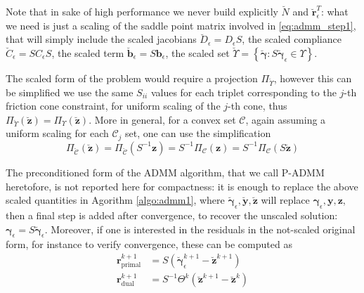 \documentclass[final,3p]{elsarticle}
\newcommand{\vect}[1]{\bm{#1}}
\begin{document}
Note that in sake of high performance we never build explicitly $\breve{N}$ and $\breve{\vect{r}}^T_\epsilon$: what we need is just a scaling of the saddle point matrix involved in \eqref{eq:admm_step1}, that will simply include the scaled jacobians
$\breve{D}_\epsilon = D_\epsilon S$, the scaled compliance
$\breve{C}_\epsilon = S C_\epsilon S$,  the scaled term 
$\breve{\vect{b}}_\epsilon = S \vect{b}_\epsilon$, the scaled set
$\breve{\Upsilon} = \left\{ \breve{\vect{\gamma}} : S \breve{\vect{\gamma}}_\epsilon \in \Upsilon  \right\}$.

The scaled form of the problem would require a projection $\Pi_{\breve{\Upsilon}}$, however this can be simplified we use the same $S_{ii}$ values for each triplet corresponding to the $j$-th friction cone constraint, for uniform scaling of the $j$-th cone, thus $\Pi_{\breve{\Upsilon}}(\breve{\vect{z}}) = \Pi_{\Upsilon}(\breve{\vect{z}})$. 
More in general, for a convex set $\mathcal{C}$, again assuming a uniform scaling for each $\mathcal{C}_j$ set, one can use the simplification
\[
\Pi_{\breve{\mathcal{C}}}(\breve{\vect{z}}) 
= \Pi_{\breve{\mathcal{C}}}(S^{-1}\vect{z}) 
= S^{-1} \Pi_{\mathcal{C}}(\vect{z}) 
= S^{-1} \Pi_{\mathcal{C}}( S \breve{\vect{z}})
\]

The preconditioned form of the ADMM algorithm, that we call P-ADMM heretofore, is not reported here for compactness: it is enough to replace the above scaled quantities in Agorithm \ref{algo:admm1}, where $\breve{\vect{\gamma}}_\epsilon,\breve{\vect{y}},\breve{\vect{z}}$ will replace $\vect{\gamma}_\epsilon, \vect{y}, \vect{z}$, then a final step is added after convergence, to recover the unscaled solution: $\vect{\gamma}_\epsilon = S \breve{\vect{\gamma}}_\epsilon$. Moreover, if one is interested in the residuals in the not-scaled original form, for instance to verify convergence, these can be computed as 
%
\begin{align}
\vect{r}_{\text{primal}}^{k+1} &= S \left( \breve{\vect{\gamma}}_\epsilon^{k+1}-\breve{\vect{z}}^{k+1} \right) \nonumber \\
\vect{r}_{\text{dual}}^{k+1}   &= S^{-1} \Theta^k (\breve{\vect{z}}^{k+1} - \breve{\vect{z}}^{k}) \nonumber
\end{align}
\end{document}
